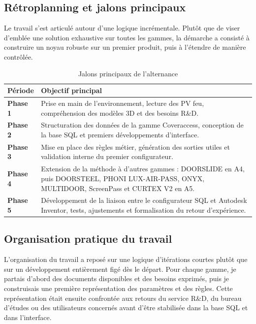 \subsection{Rétroplanning et jalons principaux}

Le travail s'est articulé autour d'une logique incrémentale. Plutôt que de viser d'emblée une solution exhaustive sur toutes les gammes, la démarche a consisté à construire un noyau robuste sur un premier produit, puis à l'étendre de manière contrôlée.

\begin{table}[H]
\centering
\caption{Jalons principaux de l'alternance}
\begin{tabularx}{\textwidth}{>{\bfseries}p{}X}
\toprule
Période & Objectif principal \\
\midrule
Phase 1 & Prise en main de l'environnement, lecture des PV feu, compréhension des modèles 3D et des besoins R\&D. \\
Phase 2 & Structuration des données de la gamme Coveraccess, conception de la base SQL et premiers développements d'interface. \\
Phase 3 & Mise en place des règles métier, génération des sorties utiles et validation interne du premier configurateur. \\
Phase 4 & Extension de la méthode à d'autres gammes : DOORSLIDE en A4, puis DOORSTEEL, PHONI LUX-AIR-PASS, ONYX, MULTIDOOR, ScreenPass et CURTEX V2 en A5. \\
Phase 5 & Développement de la liaison entre le configurateur SQL et Autodesk Inventor, tests, ajustements et formalisation du retour d'expérience. \\
\bottomrule
\end{tabularx}
\end{table}

\subsection{Organisation pratique du travail}

L'organisation du travail a reposé sur une logique d'itérations courtes plutôt que sur un développement entièrement figé dès le départ. Pour chaque gamme, je partais d'abord des documents disponibles et des besoins exprimés, puis je construisais une première représentation des paramètres et des règles. Cette représentation était ensuite confrontée aux retours du service R\&D, du bureau d'études ou des utilisateurs concernés avant d'être stabilisée dans la base SQL et dans l'interface.

